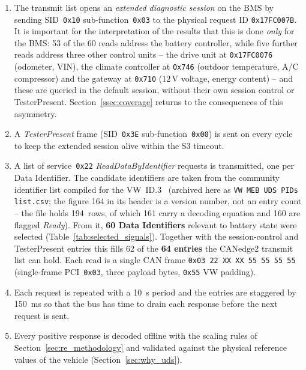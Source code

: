 \documentclass[11pt,a4paper,oneside,parskip=half]{scrreprt}
\providecommand{\hex}{}\renewcommand{\hex}[1]{\texttt{0x#1}}
\begin{document}
\begin{enumerate}
  \item The transmit list opens an \textit{extended diagnostic session} on the BMS by sending SID~\hex{10} sub-function~\hex{03} to the physical request ID \hex{17FC007B}. It is important for the interpretation of the results that this is done \emph{only} for the BMS: 53 of the 60 reads address the battery controller, while five further reads address three other control units -- the drive unit at \hex{17FC0076} (odometer, VIN), the climate controller at \hex{746} (outdoor temperature, A/C compressor) and the gateway at \hex{710} (12\,V voltage, energy content) -- and these are queried in the default session, without their own session control or TesterPresent. Section~\ref{ssec:coverage} returns to the consequences of this asymmetry.
  \item A \textit{TesterPresent} frame (SID~\hex{3E} sub-function~\hex{00}) is sent on every cycle to keep the extended session alive within the S3 timeout.
  \item A list of service~\hex{22} \textit{ReadDataByIdentifier} requests is transmitted, one per Data Identifier. The candidate identifiers are taken from the community identifier list compiled for the VW~ID.3~\cite{vwmebpidlist} (archived here as \texttt{VW MEB UDS PIDs list.csv}; the figure 164 in its header is a version number, not an entry count -- the file holds 194~rows, of which 161 carry a decoding equation and 160 are flagged \emph{Ready}). From it, \textbf{60 Data Identifiers} relevant to battery state were selected (Table~\ref{tab:selected_signals}). Together with the session-control and TesterPresent entries this fills 62 of the \textbf{64 entries} the CANedge2 transmit list can hold. Each read is a single CAN frame \hex{03 22 XX XX 55 55 55 55} (single-frame PCI~\hex{03}, three payload bytes, \hex{55} VW padding).
  \item Each request is repeated with a 10~s period and the entries are staggered by 150~ms so that the bus has time to drain each response before the next request is sent.
  \item Every positive response is decoded offline with the scaling rules of Section~\ref{sec:re_methodology} and validated against the physical reference values of the vehicle (Section~\ref{sec:why_uds}).
\end{enumerate}
\end{document}
